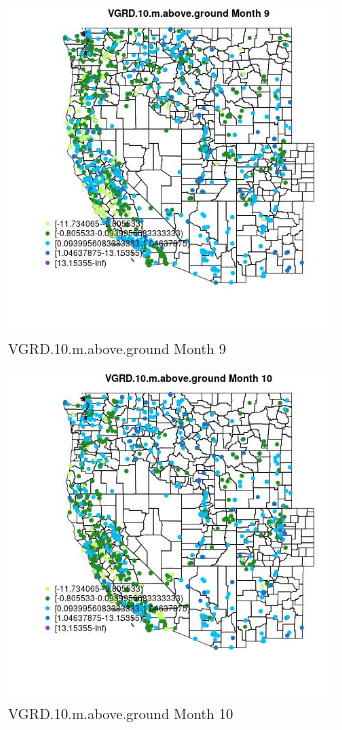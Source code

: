 \begin{figure} 
\centering  
\includegraphics[width=0.77\textwidth]{Code_Outputs/Report_ML_input_PM25_Step4_part_f_de_duplicated_aves_prioritize_24hr_obswNAs_MapObsMo9VGRD10maboveground.jpg} 
\caption{\label{fig:Report_ML_input_PM25_Step4_part_f_de_duplicated_aves_prioritize_24hr_obswNAsMapObsMo9VGRD10maboveground}VGRD.10.m.above.ground Month 9} 
\end{figure} 
 

\begin{figure} 
\centering  
\includegraphics[width=0.77\textwidth]{Code_Outputs/Report_ML_input_PM25_Step4_part_f_de_duplicated_aves_prioritize_24hr_obswNAs_MapObsMo10VGRD10maboveground.jpg} 
\caption{\label{fig:Report_ML_input_PM25_Step4_part_f_de_duplicated_aves_prioritize_24hr_obswNAsMapObsMo10VGRD10maboveground}VGRD.10.m.above.ground Month 10} 
\end{figure} 
 

